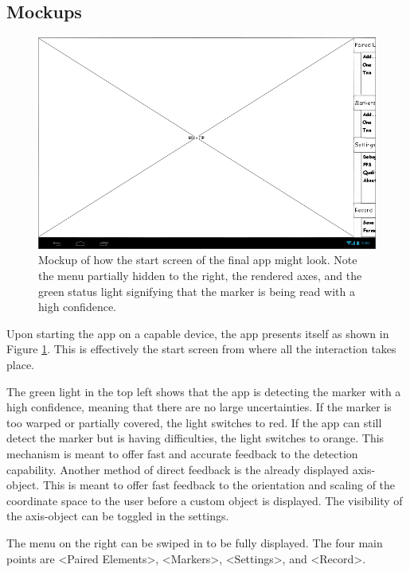 \subsection{Mockups}

\begin{figure}
	\centering
	\includegraphics[width=15cm]{images/main_nomenu.png}
	\caption[Start screen mockup.]{Mockup of how the start screen of the final app might look. Note the menu partially hidden to the right, the rendered axes, and the green status light signifying that the marker is being read with a high confidence.}
	\label{fig:main_nomenu}
\end{figure}

Upon starting the app on a capable device, the app presents itself as shown in Figure \ref{fig:main_nomenu}.
This is effectively the start screen from where all the interaction takes place.

The green light in the top left shows that the app is detecting the marker with a high confidence, meaning that there are no large uncertainties.
If the marker is too warped or partially covered, the light switches to red.
If the app can still detect the marker but is having difficulties, the light switches to orange.
This mechanism is meant to offer fast and accurate feedback to the detection capability.
Another method of direct feedback is the already displayed axis-object.
This is meant to offer fast feedback to the orientation and scaling of the coordinate space to the user before a custom object is displayed.
The visibility of the axis-object can be toggled in the settings.

The menu on the right can be swiped in to be fully displayed.
The four main points are <Paired Elements>, <Markers>, <Settings>, and <Record>.

